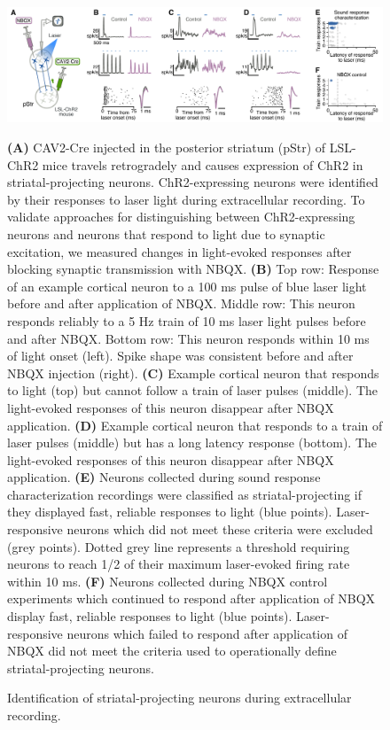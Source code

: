 \begin{figure}[hp]
  \begin{center}
    \includegraphics[width=6in]{figures/chapter3/fig2_method}%
  \end{center}
\caption{Identification of striatal-projecting neurons during extracellular recording.}{\textbf{(A)} CAV2-Cre injected in the posterior striatum (pStr) of LSL-ChR2 mice travels retrogradely and causes expression of ChR2 in striatal-projecting neurons.
%
ChR2-expressing neurons were identified by their responses to laser light during extracellular recording. 
%
To validate approaches for distinguishing between ChR2-expressing neurons and neurons that respond to light due to synaptic excitation, we measured changes in light-evoked responses after blocking synaptic transmission with NBQX.
%
\textbf{(B)} Top row: Response of an example cortical neuron to a 100 ms pulse of blue laser light before and after application of NBQX. Middle row: This neuron responds reliably to a 5 Hz train of 10 ms laser light pulses before and after NBQX. Bottom row: This neuron responds within 10 ms of light onset (left). Spike shape was consistent before and after NBQX injection (right). 
%
\textbf{(C)} Example cortical neuron that responds to light (top) but cannot follow a train of laser pulses (middle). The light-evoked responses of this neuron disappear after NBQX application. 
%
\textbf{(D)} Example cortical neuron that responds to a train of laser pulses (middle) but has a long latency response (bottom). 
%
The light-evoked responses of this neuron disappear after NBQX application. 
%
\textbf{(E)} Neurons collected during sound response characterization recordings were classified as striatal-projecting if they displayed fast, reliable responses to light (blue points). Laser-responsive neurons which did not meet these criteria were excluded (grey points).
Dotted grey line represents a threshold requiring neurons to reach 1/2 of their maximum laser-evoked firing rate within 10 ms.
%
\textbf{(F)} Neurons collected during NBQX control experiments which continued to respond after application of NBQX display fast, reliable responses to light (blue points). Laser-responsive neurons which failed to respond after application of NBQX did not meet the criteria used to operationally define striatal-projecting neurons. 
}
\end{figure}


